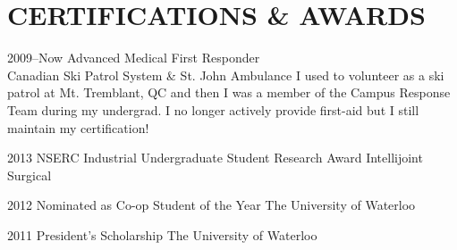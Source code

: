 \documentclass[a4paper,nocolors]{cv-friggeri-ben}
\begin{document}

\section{CERTIFICATIONS \& AWARDS}
\vspace{-2pt}

\begin{entrylist}

\entry
    {2009--Now}
    {Advanced Medical First Responder}
    {\\Canadian Ski Patrol System \& St. John Ambulance}
    {I used to volunteer as a ski patrol at Mt. Tremblant, QC and then I was
    a member of the Campus Response Team during my undergrad. I no longer
    actively provide first-aid but I still maintain my certification!}

\entry
    {2013}
    {NSERC Industrial Undergraduate Student Research Award}
    {Intellijoint Surgical}
    {\vspace{-11pt}}

\entry
    {2012}
    {Nominated as Co-op Student of the Year}
    {The University of Waterloo}
    {\vspace{-11pt}}

\entry
    {2011}
    {President's Scholarship}
    {The University of Waterloo}
    {\vspace{-11pt}}

\end{entrylist}
\end{document}
